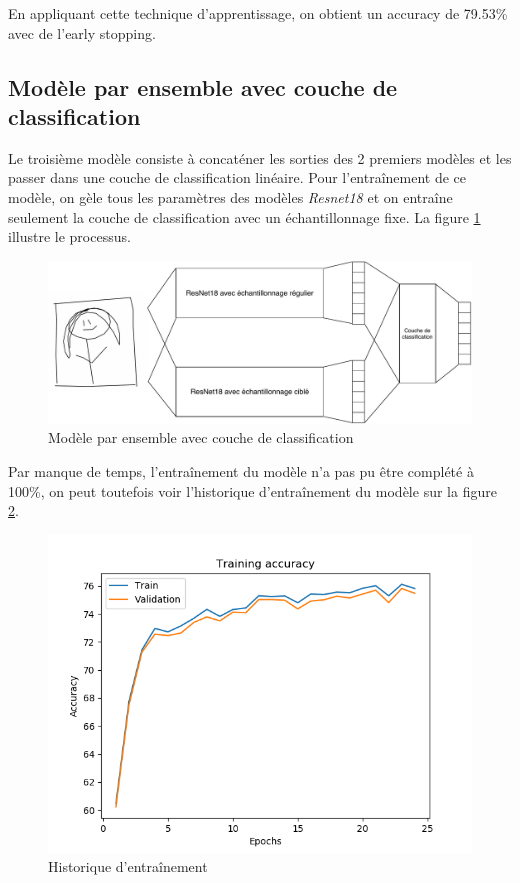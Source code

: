 En appliquant cette technique d'apprentissage, on obtient un accuracy de 79.53\% avec de l'early stopping.





\subsection{Modèle par ensemble avec couche de classification}
Le troisième modèle consiste à concaténer les sorties des 2 premiers modèles et les  passer dans une couche de classification linéaire. Pour l'entraînement de ce modèle, on gèle tous les paramètres des modèles \emph{Resnet18} et on entraîne seulement la couche de classification avec un échantillonnage fixe. La figure \ref{strutureensemble} illustre le processus.


\begin{figure}[h]
	\includegraphics[width=\linewidth]{images/structure_reseau.pdf} %
	\caption{Modèle par ensemble avec couche de classification} %
	\label{strutureensemble} 
\end{figure}


Par manque de temps, l'entraînement du modèle n'a pas pu être complété à 100\%, on peut toutefois voir l'historique d'entraînement du modèle sur la figure \ref{histmodelensemble}.


\begin{figure}[h]
	\includegraphics[width=\linewidth]{images/Model_ensemble.png} %
	\caption{Historique d'entraînement} %
	\label{histmodelensemble} 
\end{figure}


